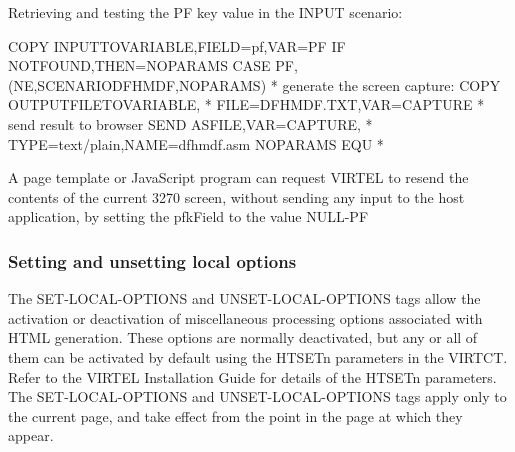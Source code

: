 \documentclass[letterpaper,10pt,english]{sphinxmanual}
\begin{document}
Retrieving and testing the PF key value in the INPUT scenario:

\begin{sphinxVerbatim}[commandchars=\\\{\}]
    COPY\PYGZdl{} INPUT\PYGZhy{}TO\PYGZhy{}VARIABLE,FIELD=\PYGZsq{}pf\PYGZsq{},VAR=\PYGZsq{}PF\PYGZsq{}
    IF\PYGZdl{} NOT\PYGZhy{}FOUND,THEN=NOPARAMS
    CASE\PYGZdl{} \PYGZsq{}PF\PYGZsq{},(NE,\PYGZsq{}SCENARIO\PYGZhy{}DFHMDF\PYGZsq{},NOPARAMS)
* generate the screen capture:
    COPY\PYGZdl{} OUTPUT\PYGZhy{}FILE\PYGZhy{}TO\PYGZhy{}VARIABLE, *
        FILE=\PYGZsq{}DFHMDF.TXT\PYGZsq{},VAR=\PYGZsq{}CAPTURE\PYGZsq{}
* send result to browser
    SEND\PYGZdl{} AS\PYGZhy{}FILE,VAR=\PYGZsq{}CAPTURE\PYGZsq{}, *
        TYPE=\PYGZsq{}text/plain\PYGZsq{},NAME=\PYGZsq{}dfhmdf.asm\PYGZsq{}
NOPARAMS EQU *
\end{sphinxVerbatim}


A page template or JavaScript program can request VIRTEL to resend the contents of the current 3270 screen, without
sending any input to the host application, by setting the pfkField to the value NULL-PF


\subsubsection{Setting and unsetting local options}
\label{\detokenize{User_Guide:setting-and-unsetting-local-options}}\label{\detokenize{User_Guide:v457ug-setting-local-options}}

The SET-LOCAL-OPTIONS and UNSET-LOCAL-OPTIONS tags allow the activation or deactivation of miscellaneous
processing options associated with HTML generation. These options are normally deactivated, but any or all of them
can be activated by default using the HTSETn parameters in the VIRTCT. Refer to the VIRTEL Installation Guide for
details of the HTSETn parameters. The SET-LOCAL-OPTIONS and UNSET-LOCAL-OPTIONS tags apply only to the current
page, and take effect from the point in the page at which they appear.
\end{document}

